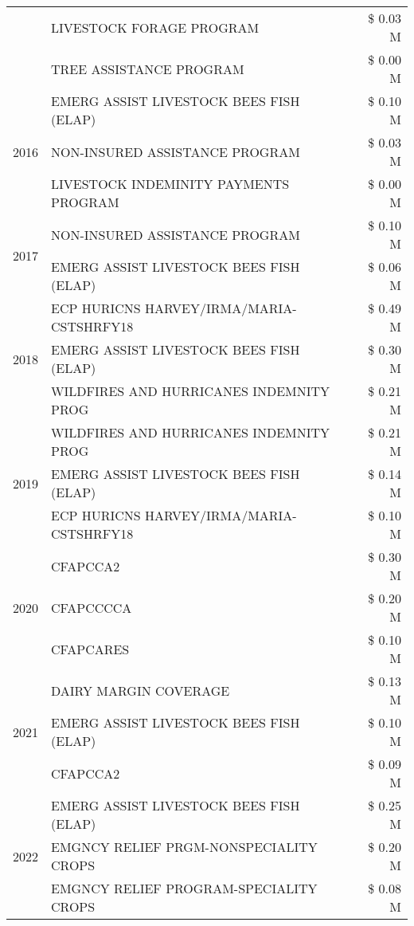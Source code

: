 \begin{tabular}{llr}
 & LIVESTOCK FORAGE PROGRAM & \$ 0.03 M \\
 & TREE ASSISTANCE PROGRAM & \$ 0.00 M \\
\cline{1-3}
\multirow[t]{3}{*}{2016} & EMERG ASSIST LIVESTOCK BEES FISH (ELAP) & \$ 0.10 M \\
 & NON-INSURED ASSISTANCE PROGRAM & \$ 0.03 M \\
 & LIVESTOCK INDEMINITY PAYMENTS PROGRAM & \$ 0.00 M \\
\cline{1-3}
\multirow[t]{2}{*}{2017} & NON-INSURED ASSISTANCE PROGRAM & \$ 0.10 M \\
 & EMERG ASSIST LIVESTOCK BEES FISH (ELAP) & \$ 0.06 M \\
\cline{1-3}
\multirow[t]{3}{*}{2018} & ECP HURICNS HARVEY/IRMA/MARIA-CSTSHRFY18 & \$ 0.49 M \\
 & EMERG ASSIST LIVESTOCK BEES FISH (ELAP) & \$ 0.30 M \\
 & WILDFIRES AND HURRICANES INDEMNITY PROG & \$ 0.21 M \\
\cline{1-3}
\multirow[t]{3}{*}{2019} & WILDFIRES AND HURRICANES INDEMNITY PROG & \$ 0.21 M \\
 & EMERG ASSIST LIVESTOCK BEES FISH (ELAP) & \$ 0.14 M \\
 & ECP HURICNS HARVEY/IRMA/MARIA-CSTSHRFY18 & \$ 0.10 M \\
\cline{1-3}
\multirow[t]{3}{*}{2020} & CFAPCCA2 & \$ 0.30 M \\
 & CFAPCCCCA & \$ 0.20 M \\
 & CFAPCARES & \$ 0.10 M \\
\cline{1-3}
\multirow[t]{3}{*}{2021} & DAIRY MARGIN COVERAGE & \$ 0.13 M \\
 & EMERG ASSIST LIVESTOCK BEES FISH (ELAP) & \$ 0.10 M \\
 & CFAPCCA2 & \$ 0.09 M \\
\cline{1-3}
\multirow[t]{3}{*}{2022} & EMERG ASSIST LIVESTOCK BEES FISH (ELAP) & \$ 0.25 M \\
 & EMGNCY RELIEF PRGM-NONSPECIALITY CROPS & \$ 0.20 M \\
 & EMGNCY RELIEF PROGRAM-SPECIALITY CROPS & \$ 0.08 M \\
\cline{1-3}
\bottomrule
\end{tabular}
